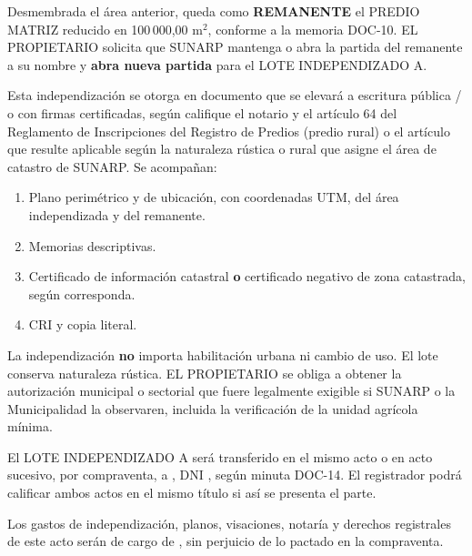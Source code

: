 \documentclass[12pt,a4paper]{article}
\begin{document}
Desmembrada el área anterior, queda como \textbf{REMANENTE} el PREDIO MATRIZ reducido en 100\,000,00 m$^2$, conforme a la memoria DOC-10. EL PROPIETARIO solicita que SUNARP mantenga o abra la partida del remanente a su nombre y \textbf{abra nueva partida} para el LOTE INDEPENDIZADO A.

Esta independización se otorga en documento que se elevará a escritura pública / o con firmas certificadas, según califique el notario y el artículo 64 del Reglamento de Inscripciones del Registro de Predios (predio rural) o el artículo que resulte aplicable según la naturaleza rústica o rural que asigne el área de catastro de SUNARP. Se acompañan:

\begin{enumerate}[leftmargin=1.15cm]
\item Plano perimétrico y de ubicación, con coordenadas UTM, del área independizada y del remanente.
\item Memorias descriptivas.
\item Certificado de información catastral \textbf{o} certificado negativo de zona catastrada, según corresponda.
\item CRI y copia literal.
\end{enumerate}

La independización \textbf{no} importa habilitación urbana ni cambio de uso. El lote conserva naturaleza rústica. EL PROPIETARIO se obliga a obtener la autorización municipal o sectorial que fuere legalmente exigible si SUNARP o la Municipalidad la observaren, incluida la verificación de la unidad agrícola mínima.

El LOTE INDEPENDIZADO A será transferido en el mismo acto o en acto sucesivo, por compraventa, a \CompradorNombreCompleto, DNI \CompradorDNI, según minuta DOC-14. El registrador podrá calificar ambos actos en el mismo título si así se presenta el parte.

Los gastos de independización, planos, visaciones, notaría y derechos registrales de este acto serán de cargo de , sin perjuicio de lo pactado en la compraventa.

\CierreMinuta
\LugarFecha

\noindent
{}
\hfill
{}

\vspace{0.85em}
\\[0.2em]
\noindent
{}
\end{document}
